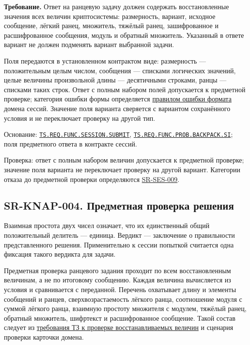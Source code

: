 \documentclass[12pt,a4paper]{article}
\begin{document}
\textbf{Требование.} Ответ на ранцевую задачу должен содержать восстановленные значения всех величин криптосистемы: размерность, вариант, исходное сообщение, лёгкий ранец, множитель, тяжёлый ранец, зашифрованное и расшифрованное сообщения, модуль и обратный множитель. Указанный в ответе вариант не должен подменять вариант выбранной задачи.

Поля передаются в установленном контрактом виде: размерность --- положительным целым числом, сообщения --- списками логических значений, целые величины произвольной длины --- десятичными строками, ранцы --- списками таких строк. Ответ с полным набором полей допускается к предметной проверке; категория ошибки формы определяется {\hyperlink{sr-ses-009-ошибка-формата}{правилом ошибки формата}} домена сессий. Значение поля варианта сверяется с вариантом сохранённого условия и не переключает проверку на другой тип.

Основание: {\href{../02\_Техническое\_задание/Техническое\_задание.pdf\#ts-req-func-session-submit}{\texttt{TS.\allowbreak{}REQ.\allowbreak{}FUNC.\allowbreak{}SESSION.\allowbreak{}SUBMIT}}}, {\href{../02\_Техническое\_задание/Техническое\_задание.pdf\#ts-req-func-prob-backpack-si}{\texttt{TS.\allowbreak{}REQ.\allowbreak{}FUNC.\allowbreak{}PROB.\allowbreak{}BACKPACK.\allowbreak{}SI}}}; поля предметного ответа в контракте сессий.

Проверка: ответ с полным набором величин допускается к предметной проверке; значение поля варианта не переключает проверку на другой вариант. Категории отказа до предметной проверки определяются {\hyperlink{sr-ses-009}{SR-SES-009}}.

\subsection{SR-KNAP-004. Предметная проверка решения}\label{sr-knap-004-ux43fux440ux435ux434ux43cux435ux442ux43dux430ux44f-ux43fux440ux43eux432ux435ux440ux43aux430-ux440ux435ux448ux435ux43dux438ux44f}

\hypertarget{sr-knap-004-предметная-проверка-решения}{}

\hypertarget{sr-knap-004}{}

Взаимная простота двух чисел означает, что их единственный общий положительный делитель --- единица. Вердикт --- заключение о правильности представленного решения. Применительно к сессии попыткой считается одна фиксация такого вердикта для задачи.

Предметная проверка ранцевого задания проходит по всем восстановленным величинам, а не по итоговому сообщению. Каждая величина вычисляется из условия и сравнивается с переданной. Перечень охватывает длину и элементы сообщений и ранцев, сверхвозрастаемость лёгкого ранца, соотношение модуля с суммой лёгкого ранца, взаимную простоту множителя с модулем, тяжёлый ранец, обратный множитель, шифртекст и расшифрованное сообщение. Такой состав следует из {\href{../02\_Техническое\_задание/Техническое\_задание.pdf\#doc-02-техническое-задание}{требования ТЗ к проверке восстанавливаемых величин}} и сценария проверки карточки домена.
\end{document}
